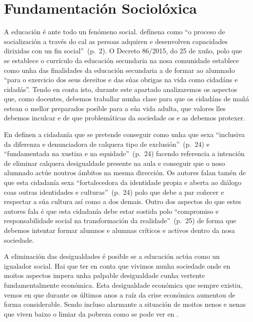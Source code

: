 
\section{Fundamentación Sociolóxica}

A educación é ante todo un fenómeno social.  defínena como ``o proceso de socialización a través do cal as persoas adquiren e desenvolven capacidades dirixidas con un fin social''~(p.~2). O Decreto 86/2015, do 25 de xuño, polo que se establece o currículo da educación secundaria na nosa comunidade establece como unha das finalidades da educación secundaria a de formar ao alumnado ``para o exercicio dos seus dereitos e das súas obrigas na vida como cidadáns e cidadás''. Tendo en conta isto, durante este apartado analizaremos os aspectos que, como docentes, debemos traballar nunha clase para que os cidadáns de mañá estean o mellor preparados posible para a súa vida adulta, que valores lles debemos inculcar e de que problemáticas da sociedade os e as debemos protexer.

En  definen a cidadanía que se pretende conseguir como unha que sexa ``inclusiva da diferenza e denunciadora de calquera tipo de exclusión''~(p.~24) e ``fundamentada na xustiza e na equidade''~(p.~24) facendo referencia a intención de eliminar calquera desigualdade presente na aula e conseguir que o noso alumnado actúe noutros ámbitos na mesma dirección. Os autores falan tamén de que esta cidadanía sexa ``fortalecedora da identidade propia e aberta ao diálogo coas outras identidades e culturas''~(p.~24) polo que debe a par coñecer e respectar a súa cultura así como a dos demais. Outro dos aspectos do que estes autores fala é que esta cidadanía debe estar sostida polo ``compromiso e responsabilidade social na transformación da realidade''~(p.~25) de forma que debemos intentar formar alumnos e alumnas críticos e activos dentro da nosa sociedade.

A eliminación das desigualdades é posible se a educación actúa como un igualador social. Hai que ter en conta que vivimos nunha sociedade onde en moitos aspectos impera unha palpable desigualdade cunha vertente fundamentalmente económica. Esta desigualdade económica que sempre existiu, vemos en  que durante os últimos anos a raíz da crise económica aumentou de forma considerable. Sendo incluso alarmante a situación de moitos nenos e nenas que viven baixo o limiar da pobreza como se pode ver en .

